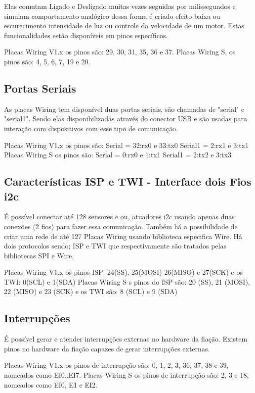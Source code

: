 Elas comutam Ligado e Desligado muitas vezes seguidas por milissegundos e simulam comportamento analógico dessa forma é criado efeito baixa ou escurecimento intensidade de luz ou controle da velocidade de um motor. Estas funcionalidades estão disponíveis em pinos específicos.

Placas Wiring V1.x os pinos são: 29, 30, 31, 35, 36 e 37.
Placas Wiring S, os pinos são: 4, 5, 6, 7, 19 e 20.

\subsection[Portas Seriais]{Portas Seriais}

As placas Wiring tem disponível duas portas seriais, são chamadas de "serial" e "serial1".  Sendo elas disponibilizadas através do conector USB e são usadas para interação com dispositivos com esse tipo de comunicação.

Placas Wiring V1.x os pinos são: Serial = 32:rx0 e 33:tx0  Serial1 = 2:rx1 e 3:tx1
Placas Wiring S os pinos são: Serial = 0:rx0 e 1:tx1 Serial1 = 2:tx2 e 3:tx3   

\subsection[Características ISP e TWI - Interface dois Fios i2c]{Características ISP e TWI - Interface dois Fios i2c}

É possível conectar até 128 sensores e ou, atuadores i2c usando apenas duas conexões (2 fios) para fazer essa comunicação. Também há a possibilidade de criar uma rede de até 127 Placas Wiring usando biblioteca especifica Wire. Há dois protocolos sendo; ISP e TWI que respectivamente são tratados pelas bibliotecas SPI e Wire.

Placas Wiring V1.x os pinos ISP: 24(SS), 25(MOSI) 26(MISO) e 27(SCK)  e os TWI: 0(SCL) e 1(SDA) 
Placas Wiring S s pinos do ISP são: 20 (SS), 21 (MOSI), 22 (MISO) e 23 (SCK) e os TWI são: 8 (SCL) e 9 (SDA)

\subsection[Interrupções]{Interrupções}

É possível gerar e atender interrupções externas no hardware da fiação. Existem pinos no hardware da fiação capazes de gerar interrupções externas.

Placas Wiring V1.x os pinos de interrupção são: 0, 1, 2, 3, 36, 37, 38 e 39, nomeados como EI0..EI7.
Placas Wiring S os pinos de interrupção são: 2, 3 e 18, nomeados como EI0, E1 e EI2.

